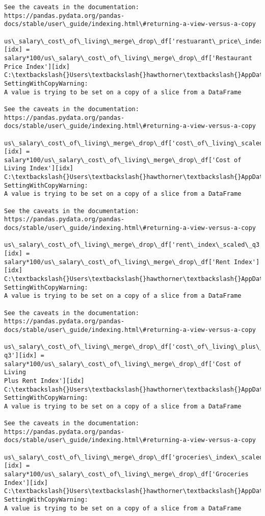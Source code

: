 \documentclass[11pt]{article}
\begin{document}
\begin{Verbatim}[commandchars=\\\{\}]
See the caveats in the documentation: https://pandas.pydata.org/pandas-
docs/stable/user\_guide/indexing.html\#returning-a-view-versus-a-copy
  us\_salary\_cost\_of\_living\_merge\_drop\_df['restuarant\_price\_index\_median'][idx] =
salary*100/us\_salary\_cost\_of\_living\_merge\_drop\_df['Restaurant Price Index'][idx]
C:\textbackslash{}Users\textbackslash{}hawthorner\textbackslash{}AppData\textbackslash{}Local\textbackslash{}Temp\textbackslash{}ipykernel\_22188\textbackslash{}94921046.py:37:
SettingWithCopyWarning:
A value is trying to be set on a copy of a slice from a DataFrame

See the caveats in the documentation: https://pandas.pydata.org/pandas-
docs/stable/user\_guide/indexing.html\#returning-a-view-versus-a-copy
  us\_salary\_cost\_of\_living\_merge\_drop\_df['cost\_of\_living\_scaled\_q3'][idx] =
salary*100/us\_salary\_cost\_of\_living\_merge\_drop\_df['Cost of Living Index'][idx]
C:\textbackslash{}Users\textbackslash{}hawthorner\textbackslash{}AppData\textbackslash{}Local\textbackslash{}Temp\textbackslash{}ipykernel\_22188\textbackslash{}94921046.py:38:
SettingWithCopyWarning:
A value is trying to be set on a copy of a slice from a DataFrame

See the caveats in the documentation: https://pandas.pydata.org/pandas-
docs/stable/user\_guide/indexing.html\#returning-a-view-versus-a-copy
  us\_salary\_cost\_of\_living\_merge\_drop\_df['rent\_index\_scaled\_q3'][idx] =
salary*100/us\_salary\_cost\_of\_living\_merge\_drop\_df['Rent Index'][idx]
C:\textbackslash{}Users\textbackslash{}hawthorner\textbackslash{}AppData\textbackslash{}Local\textbackslash{}Temp\textbackslash{}ipykernel\_22188\textbackslash{}94921046.py:39:
SettingWithCopyWarning:
A value is trying to be set on a copy of a slice from a DataFrame

See the caveats in the documentation: https://pandas.pydata.org/pandas-
docs/stable/user\_guide/indexing.html\#returning-a-view-versus-a-copy
  us\_salary\_cost\_of\_living\_merge\_drop\_df['cost\_of\_living\_plus\_rent\_index\_scaled\_
q3'][idx] = salary*100/us\_salary\_cost\_of\_living\_merge\_drop\_df['Cost of Living
Plus Rent Index'][idx]
C:\textbackslash{}Users\textbackslash{}hawthorner\textbackslash{}AppData\textbackslash{}Local\textbackslash{}Temp\textbackslash{}ipykernel\_22188\textbackslash{}94921046.py:40:
SettingWithCopyWarning:
A value is trying to be set on a copy of a slice from a DataFrame

See the caveats in the documentation: https://pandas.pydata.org/pandas-
docs/stable/user\_guide/indexing.html\#returning-a-view-versus-a-copy
  us\_salary\_cost\_of\_living\_merge\_drop\_df['groceries\_index\_scaled\_q3'][idx] =
salary*100/us\_salary\_cost\_of\_living\_merge\_drop\_df['Groceries Index'][idx]
C:\textbackslash{}Users\textbackslash{}hawthorner\textbackslash{}AppData\textbackslash{}Local\textbackslash{}Temp\textbackslash{}ipykernel\_22188\textbackslash{}94921046.py:41:
SettingWithCopyWarning:
A value is trying to be set on a copy of a slice from a DataFrame


\end{Verbatim}
\end{document}
